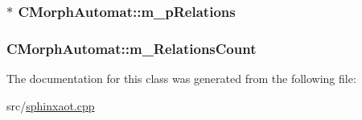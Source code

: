 \hypertarget{classCMorphAutomat_a89b2e7c587803060660791aa877f5cc3}{
\subsubsection[{m\-\_\-p\-Relations}]{$\ast$ C\-Morph\-Automat\-::m\-\_\-p\-Relations\hspace{0.3cm}{\ttfamily [protected]}}}\label{classCMorphAutomat_a89b2e7c587803060660791aa877f5cc3}
\hypertarget{classCMorphAutomat_aad30591acbb8dac7b9db5e5a9ac3cacf}{
\subsubsection[{m\-\_\-\-Relations\-Count}]{ C\-Morph\-Automat\-::m\-\_\-\-Relations\-Count\hspace{0.3cm}{\ttfamily [protected]}}}\label{classCMorphAutomat_aad30591acbb8dac7b9db5e5a9ac3cacf}


The documentation for this class was generated from the following file\-:\begin{DoxyCompactItemize}
\item 
src/\hyperlink{sphinxaot_8cpp}{sphinxaot.\-cpp}\end{DoxyCompactItemize}
